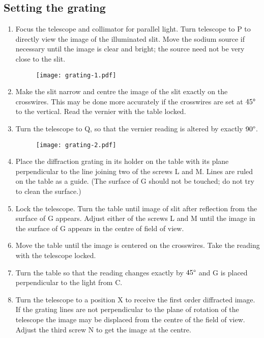 \documentclass[12pt,a4paper]{article}
\begin{document}
		\subsection{Setting the grating}
			\begin{enumerate}
				\item Focus	the telescope and collimator for parallel light. Turn telescope to P to directly view the image of the illuminated slit. Move the sodium source if necessary until the image is clear and bright; the source need not be very close to the slit.
				
				\begin{figure}[!htb]
					\centering
					\texttt{[image: grating-1.pdf]}
					\caption{}
				\end{figure}
				
				\item	Make the slit narrow and centre the image of the slit exactly on the crosswires. This may be done more accurately if the crosswires are set at $45\degree$ to the vertical. Read the vernier with the table locked.
				
				\item	 Turn the telescope to Q, so that the vernier reading is altered by exactly $90\degree$.
				
				\begin{figure}[!htb]
					\centering
					\texttt{[image: grating-2.pdf]}
					\caption{}
				\end{figure}
				
				\item	Place the diffraction grating in its holder on the table with its plane perpendicular to the line joining two of the screws L and M. Lines are ruled on the table as a guide. (The surface of G should not be touched; do not try to clean the surface.)
				
				\item 	Lock the telescope. Turn the table until image of slit after reflection from the surface of G appears. Adjust either of the screws L and M until the image in the surface of G appears in the centre of field of view.
				
				\item	Move the table until the image is centered on the crosswires. 
				Take the reading with the telescope locked.
				
				\item 	Turn the table so that the reading changes exactly by $45\degree$ and G is placed perpendicular to the light from C.
				
				\item	Turn the telescope to a position X to receive the first order diffracted image. If the grating lines are not perpendicular to the plane of rotation of the telescope the image may be displaced from the centre of the field of view. Adjust the third screw N to get the image at the centre.
			\end{enumerate}
		
\end{document}
